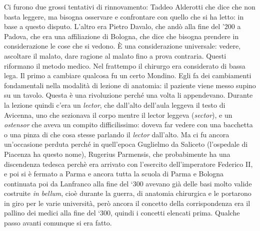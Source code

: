 Ci furono due grossi tentativi di rinnovamento: Taddeo Alderotti che
dice che non basta leggere, ma bisogna osservare e confrontare con
quello che si ha letto: in base a questo disputo. L'altro era Pietro
Davalo, che andò alla fine del '200 a Padova, che era una affiliazione
di Bologna, che dice che bisogna prendere in considerazione le cose che
si vedono. È una considerazione universale: vedere, ascoltare il malato,
dare ragione al malato fino a prova contraria. Questi riformano il
metodo medico. Nel frattempo il chirurgo era considerato di bassa lega.
Il primo a cambiare qualcosa fu un certo Mondino. Egli fa dei
cambiamenti fondamentali nella modalità di lezione di anatomia: il
paziente viene messo supino su un tavolo. Questa è una rivoluzione
perché una volta li appendevano. Durante la lezione quindi c'era un
\emph{lector}, che dall'alto dell'aula leggeva il testo di Avicenna, uno
che sezionava il corpo mentre il lector leggeva (\emph{sector}), e un
\emph{ostensor} che aveva un compito difficilissimo: doveva far vedere
con una bacchetta o una pinza di che cosa stesse parlando il
\emph{lector} dall'alto. Ma ci fu ancora un'occasione perduta perché in
quell'epoca Guglielmo da Saliceto (l'ospedale di Piacenza ha questo
nome), Rugerius Parmensis, che probabimente ha una discendenza tedesca
perchè era arrivato con l'esercito dell'imperatore Federico II, e poi si
è fermato a Parma e ancora tutta la scuola di Parma e Bologna continuata
poi da Lanfranco alla fine del `300 avevano già delle basi molto valide
costruite \emph{in bellum}, cioè durante la guerra, di anatomia
chirurgica e le portarono in giro per le varie università, però ancora
il concetto della corrispondenza era il pallino dei medici alla fine del
`300, quindi i concetti elencati prima. Qualche passo avanti comunque si
era fatto.

